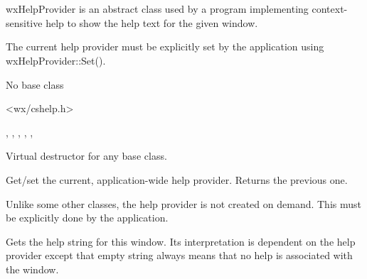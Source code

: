 \section{}\label{wxhelpprovider}

wxHelpProvider is an abstract class used by a program implementing context-sensitive help to
show the help text for the given window.

The current help provider must be explicitly set by the application using
wxHelpProvider::Set().


No base class


<wx/cshelp.h>


, , 
, , 
, 


\label{wxhelpproviderdtor}


Virtual destructor for any base class.

\label{wxhelpproviderset}


Get/set the current, application-wide help provider. Returns
the previous one.

\label{wxhelpproviderget}


Unlike some other classes, the help provider is not created on demand.
This must be explicitly done by the application.

\label{wxhelpprovidergethelp}


Gets the help string for this window. Its interpretation is dependent on the help provider
except that empty string always means that no help is associated with
the window.

